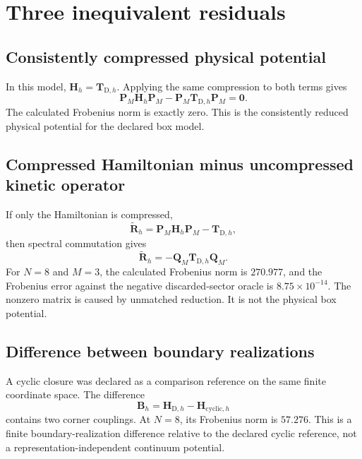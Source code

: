 \documentclass[11pt]{article}
\begin{document}
\section{Three inequivalent residuals}

\subsection{Consistently compressed physical potential}

In this model, $\mathbf H_h=\mathbf T_{\mathrm D,h}$. Applying the same
compression to both terms gives
\begin{equation}
  \mathbf P_M\mathbf H_h\mathbf P_M
  -\mathbf P_M\mathbf T_{\mathrm D,h}\mathbf P_M
  =\mathbf0.
\end{equation}
The calculated Frobenius norm is exactly zero. This is the consistently reduced
physical potential for the declared box model.

\subsection{Compressed Hamiltonian minus uncompressed kinetic operator}

If only the Hamiltonian is compressed,
\begin{equation}
  \widetilde{\mathbf R}_h
  =\mathbf P_M\mathbf H_h\mathbf P_M-\mathbf T_{\mathrm D,h},
\end{equation}
then spectral commutation gives
\begin{equation}
  \widetilde{\mathbf R}_h
  =-\mathbf Q_M\mathbf T_{\mathrm D,h}\mathbf Q_M.
\end{equation}
For $N=8$ and $M=3$, the calculated Frobenius norm is $270.977$, and the
Frobenius error against the negative discarded-sector oracle is
$8.75\times10^{-14}$. The nonzero matrix is caused by unmatched reduction. It is
not the physical box potential.

\subsection{Difference between boundary realizations}

A cyclic closure was declared as a comparison reference on the same finite
coordinate space. The difference
\begin{equation}
  \mathbf B_h
  =\mathbf H_{\mathrm D,h}-\mathbf H_{\mathrm{cyclic},h}
\end{equation}
contains two corner couplings. At $N=8$, its Frobenius norm is $57.276$. This is
a finite boundary-realization difference relative to the declared cyclic
reference, not a representation-independent continuum potential.
\end{document}

